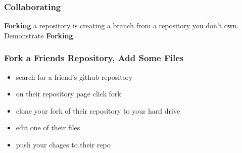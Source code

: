 \documentclass[xcolor=dvipsnames]{beamer}
\begin{document}



\begin{frame}
\frametitle{Collaborating}
\textbf{Forking} a repository is creating a branch from a repository you don't own.
\newline
\newline
Demonstrate \textbf{Forking}
\end{frame}


\begin{frame}
\frametitle{Fork a Friends Repository, Add Some Files}
\begin{itemize}
\item search for a friend's github repository
\newline
\item on their repository page click fork
\newline
\item clone your fork of their repository to your hard drive
\newline
\item edit one of their files
\newline
\item push your chages to their repo
\end{itemize}
\end{frame}
\end{document}
